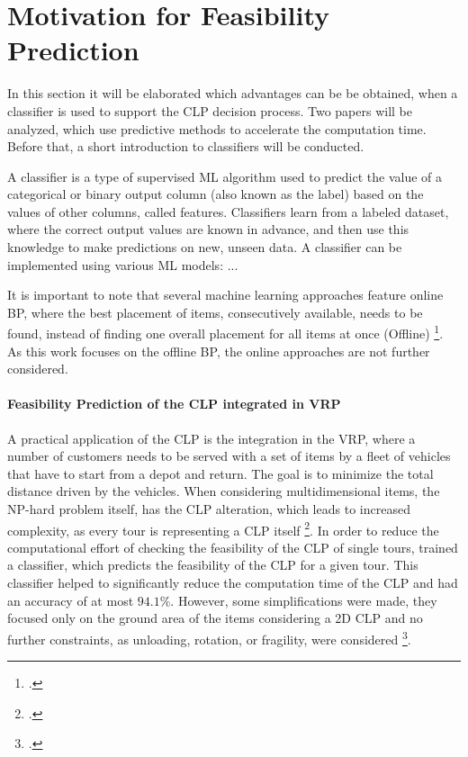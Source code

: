 \chapter{Motivation for Feasibility Prediction}
\label{sec:motivation_feasibility_prediction}
In this section it will be elaborated which advantages can be be obtained, when
a classifier is used to support the \gls{CLP} decision process. Two papers will be
analyzed, which use predictive methods to accelerate the computation time. Before that,
a short introduction to classifiers will be conducted.

A classifier is a type of supervised \gls{ML} algorithm used to predict the
value of a categorical or binary output column (also known as the label) based on the
values of other columns, called features. Classifiers learn from a labeled dataset,
where the correct output values are known in advance, and then use this knowledge to
make predictions on new, unseen data. A classifier can be implemented using various
\gls{ML} models: ...









It is important to note that several machine learning approaches feature
online \gls{BP}, where the best placement of items, consecutively available, needs
to be found, instead of finding one overall placement for all items at once
(Offline) \footcite[cf.][p. 1]{ali_-line_2022}. As this work focuses on the offline
\gls{BP}, the online approaches are not further considered.

\subsubsection{Feasibility Prediction of the \gls{CLP} integrated in \gls{VRP}}
A practical application of the \gls{CLP} is the integration in the \gls{VRP}, where
a number of customers needs to be served with a set of items by a fleet of vehicles that have
to start from a depot and return. The goal is to minimize the total distance driven
by the vehicles. When considering multidimensional items, the NP-hard problem itself,
has the \gls{CLP} alteration, which leads to increased complexity, as every tour is representing
a \gls{CLP} itself \footcite[cf.][pp.1--2]{tamke_branch-and-cut_2024}.
In order to reduce the computational effort of checking the feasibility of the \gls{CLP}
of single tours, \citeauthor{zhang_learning-based_2022} trained a classifier, which predicts
the feasibility of the \gls{CLP} for a given tour. This classifier helped to significantly
reduce the computation time of the \gls{CLP} and had an accuracy of at most $94.1\%$.
However, some simplifications were made, they focused only on the ground area of the items
considering a \gls{2D} \gls{CLP} and no further constraints, as unloading, rotation,
or fragility, were considered \footcite[cf.][pp. 4, 14]{zhang_learning-based_2022}.

